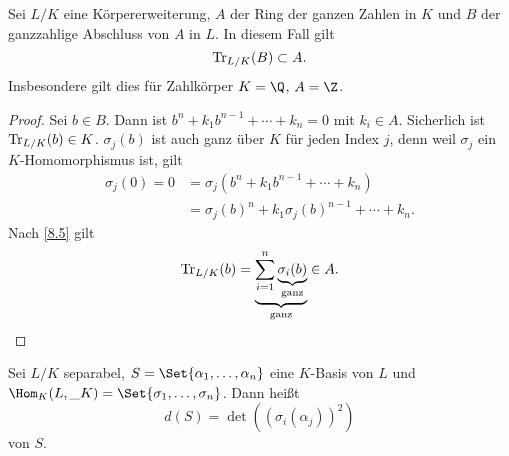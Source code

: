 \begin{kor} \label{8.6}
	Sei $L / K$ eine Körpererweiterung, $A$ der Ring der ganzen Zahlen in $K$ und $B$ der ganzzahlige Abschluss von $A$ in $L$.
	In diesem Fall gilt
	\[
		\operatorname{Tr}_{L/K}(B) \subset A.
	\]
	Insbesondere gilt dies für Zahlkörper $K = \Q$, $A = \Z$.
	\begin{proof}
		Sei $b \in B$. Dann ist $b^n + k_1 b^{n-1} + \dotsb + k_n = 0$ mit $k_i \in A$.
		Sicherlich ist $\operatorname{Tr}_{L/K}(b) \in K$.
		$\sigma_j(b)$ ist auch ganz über $K$ für jeden Index $j$, denn weil $\sigma_j$ ein $K$-Homomorphismus ist, gilt
		\begin{align*}
			\sigma_j(0)
			= 0
			&= \sigma_j(b^n + k_1b^{n-1} + \dotsb + k_n) \\
			&= \sigma_j(b)^n + k_1 \sigma_j(b)^{n-1} + \dotsb + k_n.
		\end{align*}
		Nach \ref{8.5} gilt
		\[
			\operatorname{Tr}_{L/K}(b)
			= \underbrace{\sum_{i=1}^n \underbrace{\sigma_i(b)}_{\text{ganz}}}_{\text{ganz}}
			\in A.
		\]
	\end{proof}
\end{kor}

\begin{df} \label{8.7}
	Sei $L/K$ separabel, $S = \Set{\alpha_1, \dotsc, \alpha_n}$ eine $K$-Basis von $L$ und $\Hom_{K}(L, \_K) = \Set{ \sigma_1, \dotsc, \sigma_n}$.
	Dann heißt
	\[
		d(S) = \det((\sigma_i(\alpha_j))^2)
	\]
	 von $S$.
\end{df}

